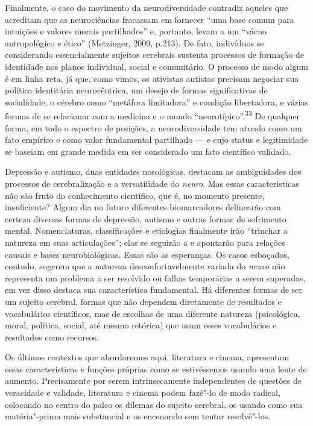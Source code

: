 Finalmente, o caso do movimento da neurodiversidade contradiz aqueles
que acreditam que as neurociências fracassam em fornecer ``uma base
comum para intuições e valores morais partilhados'' e, portanto, levam a
um ``vácuo antropológico e ético'' (Metzinger, 2009, p.213). De fato,
indivíduos se considerando essencialmente sujeitos cerebrais sustenta
processos de formação de identidade nos planos individual, social e
comunitário. O processo de modo algum é em linha reta, já que, como
vimos, os ativistas autistas precisam negociar sua política identitária
neurocêntrica, um desejo de formas significativas de socialidade, o
cérebro como ``metáfora limitadora'' e condição libertadora, e várias
formas de se relacionar com a medicina e o mundo
``neurotípico''.\textsuperscript{33} De qualquer forma, em todo o
espectro de posições, a neurodiversidade tem atuado como um fato
empírico e como valor fundamental partilhado --- e cujo status e
legitimidade se baseiam em grande medida em ser considerado um fato
científico validado.

Depressão e autismo, duas entidades nosológicas, destacam as
ambiguidades dos processos de cerebralização e a versatilidade do
\emph{neuro}. Mas essas características não são fruto do conhecimento
científico, que é, no momento presente, insuficiente? Algum dia no
futuro diferentes biomarcadores delinearão com certeza diversas formas
de depressão, autismo e outras formas de sofrimento mental.
Nomenclaturas, classificações e etiologias finalmente irão ``trinchar a
natureza em suas articulações''; elas se seguirão a e apontarão para
relações causais e bases neurobiológicas. Essas são as esperanças. Os
casos esboçados, contudo, sugerem que a natureza desconfortavelmente
variada do \emph{neuro} não representa um problema a ser resolvido ou
falhas temporárias a serem superadas, em vez disso destaca sua
característica fundamental. Há diferentes formas de ser um sujeito
cerebral, formas que não dependem diretamente de resultados e
vocabulários científicos, mas de escolhas de uma diferente natureza
(psicológica, moral, política, social, até mesmo retórica) que usam
esses vocabulários e resultados como recursos.

Os últimos contextos que abordaremos aqui, literatura e cinema,
apresentam essas características e funções próprias como se estivéssemos
usando uma lente de aumento. Precisamente por serem intrinsecamente
independentes de questões de veracidade e validade, literatura e cinema
podem fazê"-lo de modo radical, colocando no centro do palco os dilemas
do sujeito cerebral, os usando como sua matéria"-prima mais substancial e
os encenando sem tentar resolvê"-los.

